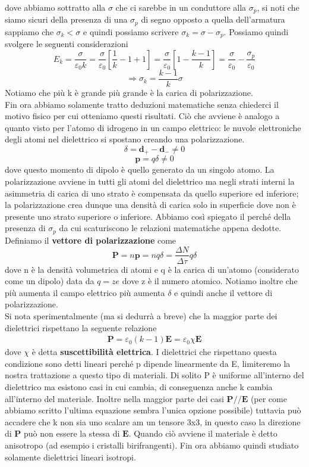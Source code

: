 \documentclass[
10pt, %
a4paper, %
oneside, %
headinclude,footinclude, %
BCOR5mm, %
]{scrartcl}
\begin{document}
dove abbiamo sottratto alla $\sigma$ che ci sarebbe in un conduttore alla $\sigma_p$, si noti che siamo sicuri della presenza di una $\sigma_p$ di segno opposto a quella dell'armatura  sappiamo che \(\sigma_k<\sigma\) e quindi possiamo scrivere \(\sigma_k = \sigma -\sigma_p\). Possiamo quindi svolgere le seguenti considerazioni
\[E_k = \frac{\sigma }{\varepsilon_0 k} = \frac{\sigma}{\varepsilon_0}\left[\frac{1}{k}-1+1\right] = \frac{\sigma}{\varepsilon_0}\left[1-\frac{k-1}{k}\right] = \frac{\sigma}{\varepsilon_0}-\frac{\sigma_p}{\varepsilon_0}\]
\[\Rightarrow \sigma_k = \frac{k-1}{k}\sigma\]
Notiamo che più k è grande più grande è la carica di polarizzazione.\\
Fin ora abbiamo solamente tratto deduzioni matematiche senza chiederci il motivo fisico per cui otteniamo questi risultati. Ciò che avviene è analogo a quanto visto per l'atomo di idrogeno in un campo elettrico: le nuvole elettroniche degli atomi nel dielettrico si spostano creando una polarizzazione. 
\[\delta = \mathbf{d}_+ -\mathbf{d}_- \neq 0\]
\[\mathbf{p} = q\delta\neq 0\]
dove questo momento di dipolo è quello generato da un singolo atomo. La polarizzazione avviene in tutti gli atomi del dielettrico ma negli strati interni la asimmetria di carica di uno strato è compensata da quello superiore ed inferiore; la polarizzazione crea dunque una densità di carica solo in superficie dove non è presente uno strato superiore o inferiore. Abbiamo così spiegato il perché della presenza di \(\sigma_p\) da cui scaturiscono le relazioni matematiche appena dedotte. Definiamo il \textbf{vettore di polarizzazione} come
\[\mathbf{P} = n\mathbf{p} = nq\delta = \frac{\Delta N}{\Delta \tau} q \delta \]  
dove n è la densità volumetrica di atomi e q è la carica di un'atomo (considerato come un dipolo) data da \(q = ze\) dove z è il numero atomico. Notiamo inoltre che più aumenta il campo elettrico più aumenta $\delta$ e quindi anche il vettore di polarizzazione.\\
Si nota sperimentalmente (ma si dedurrà a breve) che la maggior parte dei dielettrici rispettano la seguente relazione
\begin{align}\label{eq:polarizzazione_lineare}
	\mathbf{P} = \varepsilon_0(k-1)\mathbf{E} = \varepsilon_0 \chi \mathbf{E}
\end{align}
dove $\chi$ è detta \textbf{suscettibilità elettrica}. I dielettrici che rispettano questa condizione sono detti lineari perché p dipende linearmente da E, limiteremo la nostra trattazione a questo tipo di materiali. Di solito P è uniforme all'interno del dielettrico ma esistono casi in cui cambia, di conseguenza anche k cambia all'interno del materiale. Inoltre nella maggior parte dei casi \(\mathbf{P} // \mathbf{E}\) (per come abbiamo scritto l'ultima equazione sembra l'unica opzione possibile) tuttavia può accadere che k non sia uno scalare am un tensore 3x3, in questo caso la direzione di $\mathbf{P}$ può non essere la stessa di $\mathbf{E}$. Quando ciò avviene il materiale è detto anisotropo (ad esempio i cristalli birifrangenti). Fin ora abbiamo quindi studiato solamente dielettrici lineari isotropi.
\end{document}
